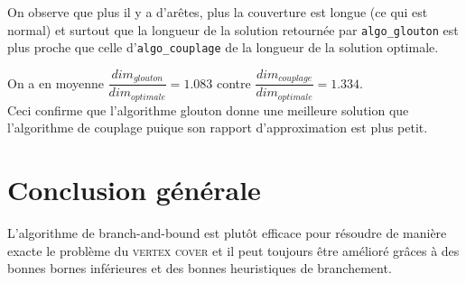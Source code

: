 \documentclass[12pt]{article}
\begin{document}
        On observe que plus il y a d'arêtes, plus la couverture est longue (ce qui est normal) et surtout que la longueur de la solution retournée par \texttt{algo\_glouton} est plus proche que celle d'\texttt{algo\_couplage} de la longueur de la solution optimale.
        
        On a en moyenne $\dfrac{dim_{glouton}}{dim_{optimale}} = 1.083 $ contre $\dfrac{dim_{couplage}}{dim_{optimale}} = 1.334 $. \\
        Ceci confirme que l'algorithme glouton donne une meilleure solution que l'algorithme de couplage puique son rapport d'approximation est plus petit.

\section{Conclusion générale}

    L'algorithme de branch-and-bound est plutôt efficace pour résoudre de manière exacte le problème du \textsc{vertex cover} et il peut toujours être amélioré grâces à des bonnes bornes inférieures et des bonnes heuristiques de branchement.       
\end{document}
